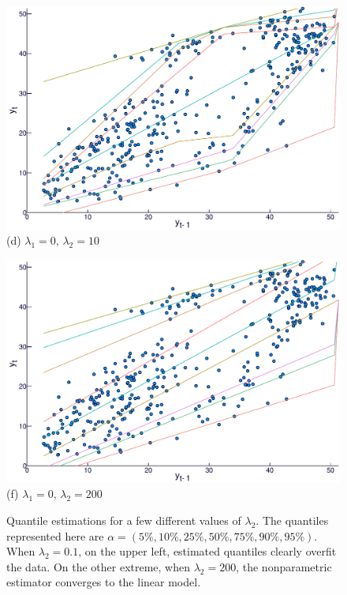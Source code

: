 \begin{figure}[htp]
\begin{minipage}[t]{0.4\linewidth}
\begin{minipage}[b]{\linewidth}
      \centering     \includegraphics[width=\textwidth]{Images/icaraizinho-crossing-10}
      {(d) $\lambda_1 = 0, \, \lambda_2 = 10$}
    \end{minipage}
     \begin{minipage}[b]{\linewidth}
      \centering     \includegraphics[width=\textwidth]{Images/icaraizinho-crossing-200}
      {(f) $\lambda_1 = 0, \, \lambda_2 = 200$}
      \label{fig:npqar-cross}
     \end{minipage}
  \end{minipage}
  \caption{Quantile estimations for a few different values of $\lambda_2$. The quantiles represented here are $\alpha = (5\%, 10\%, 25\%, 50\%, 75\%, 90\%, 95\%)$. When $\lambda_2 = 0.1$, on the upper left, estimated quantiles clearly overfit the data. On the other extreme, when $\lambda_2=200$, the nonparametric estimator converges to the linear model.}
  \label{fig:npqar-results}
\end{figure}

